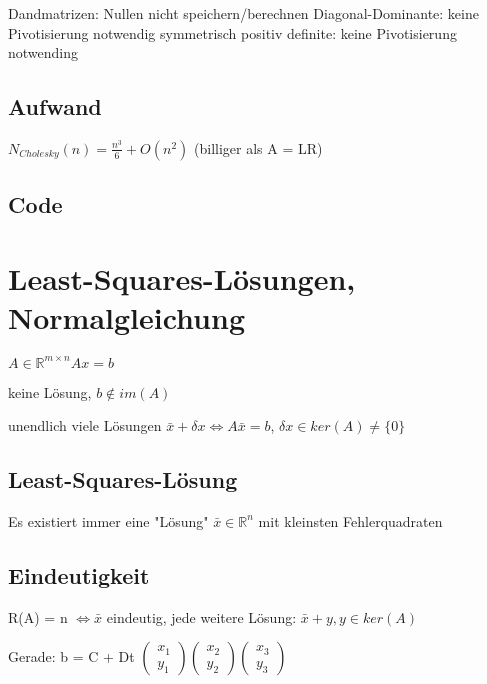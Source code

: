 \documentclass[12pt,a4paper]{article} %
\newcommand*\tab[1][1cm]{\hspace*{#1}}
\begin{document}
	Dandmatrizen: Nullen nicht speichern/berechnen Diagonal-Dominante: keine Pivotisierung notwendig symmetrisch positiv definite: keine Pivotisierung notwending
	
	\subsection{Aufwand}
	
	$N_{Cholesky}(n) = \frac{n^3}{6} + O(n^2)$ \tab (billiger als A = LR)
	
	\subsection{Code}
	
	\newpage
	
	\section{Least-Squares-Lösungen, Normalgleichung}
	
	$A \in \mathbb{R}^{m \times n} Ax = b$
	
	keine Lösung, $b \notin im(A)$
	
	unendlich viele Lösungen $\bar{x} + \delta x \Leftrightarrow A\bar{x}= b$, $\delta x \in ker(A) \ne \{0\}$
	
	\subsection{Least-Squares-Lösung}
	
	Es existiert immer eine "Lösung" $\bar{x} \in \mathbb{R}^n$ mit kleinsten Fehlerquadraten
	
	\subsection{Eindeutigkeit}
	
	R(A) = n $\Leftrightarrow \bar{x}$ eindeutig, jede weitere Lösung: $\bar{x} + y, y \in ker(A)$
	
	Gerade: b = C + Dt 
	$\begin{pmatrix}
		x_1 \\
		y_1
	\end{pmatrix}
	\begin{pmatrix}
	x_2 \\
	y_2
	\end{pmatrix}
	\begin{pmatrix}
	x_3 \\
	y_3
	\end{pmatrix}$
	
\end{document}
